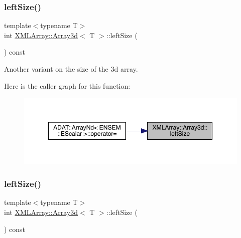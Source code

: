 \subsubsection{\texorpdfstring{leftSize()}{leftSize()}\hspace{0.1cm}{\footnotesize\ttfamily [1/2]}}
{\footnotesize\ttfamily template$<$typename T$>$ \\
int \mbox{\hyperlink{classXMLArray_1_1Array3d}{X\+M\+L\+Array\+::\+Array3d}}$<$ T $>$\+::left\+Size (\begin{DoxyParamCaption}{ }\end{DoxyParamCaption}) const\hspace{0.3cm}{\ttfamily [inline]}}



Another variant on the size of the 3d array. 

Here is the caller graph for this function\+:\nopagebreak
\begin{figure}[H]
\begin{center}
\leavevmode
\includegraphics[width=350pt]{db/da0/classXMLArray_1_1Array3d_a22b8137d2675f4e8f27d475abb217b7a_icgraph}
\end{center}
\end{figure}
\mbox{\label{classXMLArray_1_1Array3d_a22b8137d2675f4e8f27d475abb217b7a}} 
\subsubsection{\texorpdfstring{leftSize()}{leftSize()}\hspace{0.1cm}{\footnotesize\ttfamily [2/2]}}
{\footnotesize\ttfamily template$<$typename T$>$ \\
int \mbox{\hyperlink{classXMLArray_1_1Array3d}{X\+M\+L\+Array\+::\+Array3d}}$<$ T $>$\+::left\+Size (\begin{DoxyParamCaption}{ }\end{DoxyParamCaption}) const\hspace{0.3cm}{\ttfamily [inline]}}




